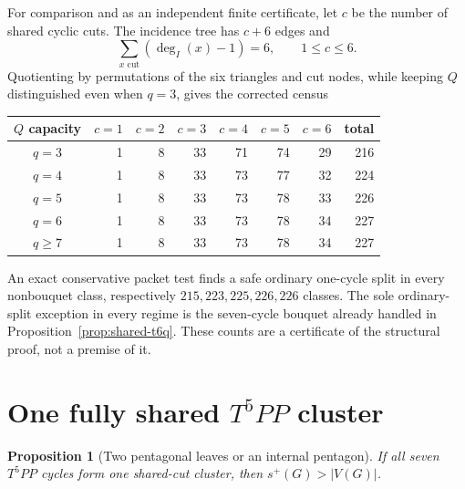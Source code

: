 \documentclass[11pt]{article}
\newtheorem{proposition}[theorem]{Proposition}
\newcommand{\spE}{s^+}
\begin{document}
For comparison and as an independent finite certificate, let $c$ be the
number of shared cyclic cuts.  The incidence tree has $c+6$ edges and
\[
 \sum_{x\text{ cut}}(\deg_I(x)-1)=6,
 \qquad 1\leq c\leq6.
\]
Quotienting by permutations of the six triangles and cut nodes, while keeping
$Q$ distinguished even when $q=3$, gives the corrected census
\begin{center}
\begin{tabular}{c|rrrrrr|r}
$Q$ capacity&$c=1$&$c=2$&$c=3$&$c=4$&$c=5$&$c=6$&total\\ \hline
$q=3$&1&8&33&71&74&29&216\\
$q=4$&1&8&33&73&77&32&224\\
$q=5$&1&8&33&73&78&33&226\\
$q=6$&1&8&33&73&78&34&227\\
$q\geq7$&1&8&33&73&78&34&227
\end{tabular}
\end{center}
An exact conservative packet test finds a safe ordinary one-cycle split in
every nonbouquet class, respectively $215,223,225,226,226$ classes.  The sole
ordinary-split exception in every regime is the seven-cycle bouquet already
handled in Proposition~\ref{prop:shared-t6q}.  These counts are a certificate
of the structural proof, not a premise of it.

\section{One fully shared $T^5PP$ cluster}

\begin{proposition}[Two pentagonal leaves or an internal pentagon]
\label{prop:shared-t5pp}
If all seven $T^5PP$ cycles form one shared-cut cluster, then
$\spE(G)>|V(G)|$.
\end{proposition}
\end{document}

